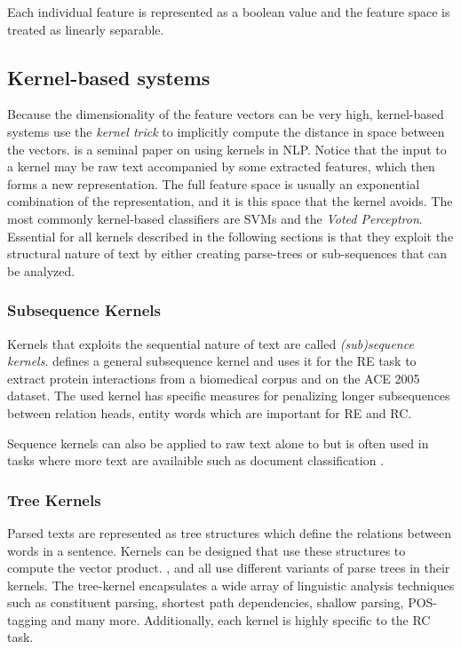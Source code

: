 Each individual feature is represented as a boolean value and the feature space is treated as linearly separable. 

\subsection{Kernel-based systems}

Because the dimensionality of the feature vectors can be very high, kernel-based systems use the \emph{kernel trick} to implicitly compute the distance in space between the vectors. \cite{collins2001} is a seminal paper on using kernels in NLP. Notice that the input to a kernel may be raw text accompanied by some extracted features, which then forms a new representation. The full feature space is usually an exponential combination of the representation, and it is this space that the kernel avoids. The most commonly kernel-based classifiers are SVMs and the \emph{Voted Perceptron}\cite{freund1999}.   
Essential for all kernels described in the following sections is that they exploit the structural nature of text by either creating parse-trees or sub-sequences that can be analyzed. 

\subsubsection{Subsequence Kernels}

Kernels that exploits the sequential nature of text are called \emph{(sub)sequence kernels}. \cite{subsequence_kernel} defines a general subsequence kernel and uses it for the RE task to extract protein interactions from a biomedical corpus and on the ACE 2005 dataset. The used kernel has specific measures for penalizing longer subsequences between relation heads, entity words which are important for RE and RC. 

Sequence kernels can also be applied to raw text alone to but is often used in tasks where more text are availaible such as document classification \cite{lodhi2002}.  

\subsubsection{Tree Kernels}

Parsed texts are represented as tree structures which define the relations between words in a sentence. Kernels can be designed that use these structures to compute the vector product. \cite{zelenko2003}, \cite{zhou2007} and \cite{qian2008} all use different variants of parse trees in their kernels. The tree-kernel encapsulates a wide array of linguistic analysis techniques such as constituent parsing, shortest path dependencies, shallow parsing, POS-tagging and many more. Additionally, each kernel is highly specific to the RC task. 

